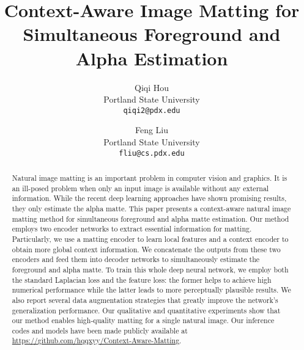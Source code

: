 \documentclass[10pt,twocolumn,letterpaper]{article}
\begin{document}
\title{Context-Aware Image Matting for Simultaneous Foreground and Alpha Estimation}

\author{Qiqi Hou\\
Portland State University\\
{\tt\small qiqi2@pdx.edu}
\and
Feng Liu\\
Portland State University\\
{\tt\small fliu@cs.pdx.edu}
}

\maketitle



\begin{abstract}


Natural image matting is an important problem in computer vision and graphics. It is an ill-posed problem when only an input image is available without any external information. While the recent deep learning approaches have shown promising results, they only estimate the alpha matte. This paper presents a context-aware natural image matting method for simultaneous foreground and alpha matte estimation. Our method employs two encoder networks to extract essential information for matting. Particularly, we use a matting encoder to learn local features and a context encoder to obtain more global context information. We concatenate the outputs from these two encoders and feed them into decoder networks to simultaneously estimate the foreground and alpha matte. To train this whole deep neural network, we employ both the standard Laplacian loss and the feature loss: the former helps to achieve high numerical performance while the latter leads to more perceptually plausible results. We also report several data augmentation strategies that greatly improve the network's generalization performance. Our qualitative and quantitative experiments show that our method enables high-quality matting for a single natural image. Our inference codes and models have been made publicly available at \url{https://github.com/hqqxyy/Context-Aware-Matting}.


\end{abstract}
\end{document}
